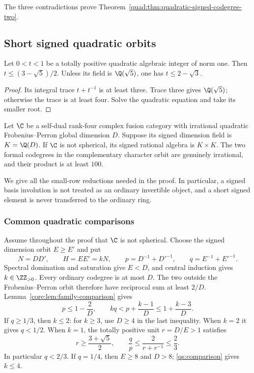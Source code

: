 The three contradictions prove
Theorem~\ref{quad:thm:quadratic-signed-codegree-two}.

\subsection{Short signed quadratic orbits}\label{sec:short-signed}
\begin{lemma}\label{quad:lem:unit-gap}
Let $0<t<1$ be a totally positive quadratic algebraic integer of norm
one. Then $t\le(3-\sqrt5)/2$. Unless its field is
$\Q(\sqrt5)$, one has $t\le2-\sqrt3$.
\end{lemma}
\begin{proof}
Its integral trace $t+t^{-1}$ is at least three. Trace three gives
$\Q(\sqrt5)$; otherwise the trace is at least four. Solve the
quadratic equation and take its smaller root.
\end{proof}


\begin{theorem}\label{qs:short-orbits}
Let $\C$ be a self-dual rank-four complex fusion category
with irrational quadratic Frobenius--Perron global dimension $D$.
Suppose its signed dimension field is $K=\Q(D)$.
If $\C$ is not spherical, its signed rational algebra is
$K\times K$. The two formal codegrees in the complementary character
orbit are genuinely irrational, and their product is at least $100$.
\end{theorem}

We give all the small-row reductions needed in the proof. In particular,
a signed basis involution is not treated as an ordinary invertible
object, and a short signed element is never transferred to the ordinary
ring.

\subsubsection{Common quadratic comparisons}

Assume throughout the proof that $\C$ is not spherical.
Choose the signed dimension orbit $E\ge E'$ and put
\[
 N=DD',\qquad H=EE'=kN,\qquad
 p=D^{-1}+D'^{-1},\qquad q=E^{-1}+E'^{-1}.
\]
Spectral domination and saturation give $E<D$, and central induction
gives $k\in\ZZ_{>0}$. Every ordinary codegree is at most $D$.
The two outside the Frobenius--Perron orbit therefore have reciprocal
sum at least $2/D$. Lemma~\ref{core:lem:family-comparison} gives
\begin{equation}\label{qs:comparison}
 p\le1-\frac2D,\qquad
 kq<p+\frac{k-1}{D}\le1+\frac{k-3}{D}.
\end{equation}
If $q\ge1/3$, then $k\le2$: for $k\ge3$, use $D\ge4$ in the
last inequality. When $k=2$ it gives $q<1/2$.
When $k=1$, the totally positive unit $r=D/E>1$ satisfies
\[
 r\ge\frac{3+\sqrt5}{2},\qquad
 \frac qp\le\frac2{r+r^{-1}}\le\frac23.
\]
In particular $q<2/3$. If $q=1/4$, then $E\ge8$ and $D>8$;
\eqref{qs:comparison} gives $k\le4$.

